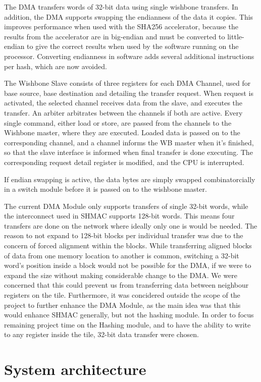 The DMA transfers words of 32-bit data using single wishbone transfers.  In addition, the DMA supports
swapping the endianness of the data it copies. This improves performance when used with the SHA256
accelerator, because the results from the accelerator are in big-endian
and must be converted to little-endian to give the correct results when used by the software running on the processor.
Converting endianness in software adds several additional instructions per hash, which are now avoided.

The Wishbone Slave consists of three registers for each DMA Channel, used for base source, base destination and detailing the transfer request.
When request is activated, the selected channel receives data from the slave, and executes the transfer.
An arbiter arbitrates between the channels if both are active.
Every single command, either load or store, are passed from the channels to the Wishbone master, where they are executed.
Loaded data is passed on to the corresponding channel, and a channel informs the WB master when it's finished, so that the slave interface is informed when final transfer is done executing.
The corresponding request detail register is modified, and the CPU is interrupted.

If endian swapping is active, the data bytes are simply swapped combinatorcially in a switch module before it is passed on to the wishbone master.

The current DMA Module only supports transfers of single 32-bit words, while the interconnect used in SHMAC supports 128-bit words.
This means four transfers are done on the network where ideally only one is would be needed. 
The reason to not expand to 128-bit blocks per individual transfer was due to the concern of forced alignment within the blocks.
While transferring aligned blocks of data from one memory location to another is common, switching a 32-bit word's position inside a block would not be possible for the DMA, if we were to expand the size without making considerable change to the DMA. 
We were concerned that this could prevent us from transferring data between neighbour registers on the tile.
Furthermore, it was concidered outside the scope of the project to further enhance the DMA Module, as the main idea was that this would enhance SHMAC generally, but not the hashing module.
In order to focus remaining project time on the Hashing module, and to have the ability to write to any register inside the tile, 32-bit data transfer were chosen.

\section{System architecture}
\label{sec:SHMAC_sys_arch}

